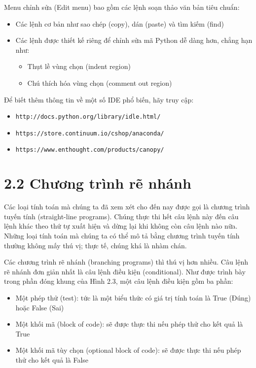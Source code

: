 Menu chỉnh sửa (Edit menu) bao gồm các lệnh soạn thảo văn bản tiêu chuẩn:
\begin{itemize}
    \item Các lệnh cơ bản như sao chép (copy), dán (paste) và tìm kiếm (find)
    \item Các lệnh được thiết kế riêng để chỉnh sửa mã Python dễ dàng hơn, chẳng hạn như:
    \begin{itemize}
        \item Thụt lề vùng chọn (indent region)
        \item Chú thích hóa vùng chọn (comment out region)
    \end{itemize}
\end{itemize}

Để biết thêm thông tin về một số IDE phổ biến, hãy truy cập:
\begin{itemize}
    \item \texttt{http://docs.python.org/library/idle.html/}
    \item \texttt{https://store.continuum.io/cshop/anaconda/}
    \item \texttt{https://www.enthought.com/products/canopy/}
\end{itemize}

\section*{2.2 Chương trình rẽ nhánh}

\noindent \indent Các loại tính toán mà chúng ta đã xem xét cho đến nay được gọi là chương trình tuyến tính (straight-line programs). Chúng thực thi hết câu lệnh này đến câu lệnh khác theo thứ tự xuất hiện và dừng lại khi không còn câu lệnh nào nữa. Những loại tính toán mà chúng ta có thể mô tả bằng chương trình tuyến tính thường không mấy thú vị; thực tế, chúng khá là nhàm chán.

Các chương trình rẽ nhánh (branching programs) thì thú vị hơn nhiều. Câu lệnh rẽ nhánh đơn giản nhất là câu lệnh điều kiện (conditional). Như được trình bày trong phần đóng khung của Hình 2.3, một câu lệnh điều kiện gồm ba phần:

\begin{itemize}
    \item Một phép thử (test): tức là một biểu thức có giá trị tính toán là True (Đúng) hoặc False (Sai)
    
    \item Một khối mã (block of code): sẽ được thực thi nếu phép thử cho kết quả là True
    
    \item Một khối mã tùy chọn (optional block of code): sẽ được thực thi nếu phép thử cho kết quả là False
\end{itemize}


